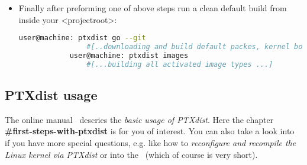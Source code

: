 \begin{itemize}


    \item Finally after preforming one of above steps run a clean default build
        from inside your <projectroot>:
        \begin{lstlisting}[language=bash,gobble=12,caption={Initial PTXdist
        build}]
            user@machine: ptxdist go --git
                #[..downloading and build default packes, kernel bootloader...]
            user@machine: ptxdist images
                #[...building all activated image types ...]
        \end{lstlisting}
\end{itemize}



\subsection{PTXdist usage}%

The online manual~\cite[PTXdist user manual]{ptxdist_manual} descries the
\textit{basic usage of PTXdist}. Here the chapter
    \textbf{\#first-steps-with-ptxdist} is for you of interest. You can also
    take a look into~\cite{ptxdist_developer} if you have more special
    questions, e.g. like how to \textit{reconfigure and recompile the Linux
    kernel via PTXdist} or into the~\cite[PTXdist FAQ list]{ptxdist_faq} (which
    of course is very short).

